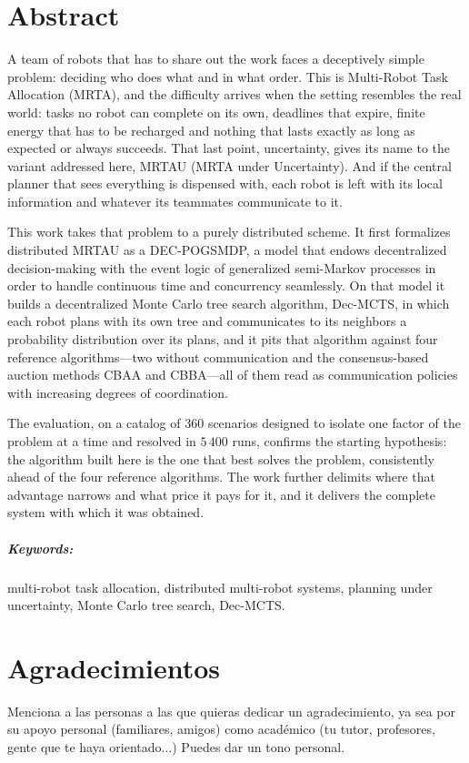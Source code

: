 \documentclass[a4paper,oneside,12pt]{book}
\theoremstyle{definition}
\begin{document}
\chapter{Abstract}
\begin{small}
A team of robots that has to share out the work faces a deceptively simple problem: deciding who does what and in what order. This is Multi-Robot Task Allocation (MRTA), and the difficulty arrives when the setting resembles the real world: tasks no robot can complete on its own, deadlines that expire, finite energy that has to be recharged and nothing that lasts exactly as long as expected or always succeeds. That last point, uncertainty, gives its name to the variant addressed here, MRTAU (MRTA under Uncertainty). And if the central planner that sees everything is dispensed with, each robot is left with its local information and whatever its teammates communicate to it.

This work takes that problem to a purely distributed scheme. It first formalizes distributed MRTAU as a DEC-POGSMDP, a model that endows decentralized decision-making with the event logic of generalized semi-Markov processes in order to handle continuous time and concurrency seamlessly. On that model it builds a decentralized Monte Carlo tree search algorithm, Dec-MCTS, in which each robot plans with its own tree and communicates to its neighbors a probability distribution over its plans, and it pits that algorithm against four reference algorithms---two without communication and the consensus-based auction methods CBAA and CBBA---all of them read as communication policies with increasing degrees of coordination.

The evaluation, on a catalog of $360$ scenarios designed to isolate one factor of the problem at a time and resolved in $5\,400$ runs, confirms the starting hypothesis: the algorithm built here is the one that best solves the problem, consistently ahead of the four reference algorithms. The work further delimits where that advantage narrows and what price it pays for it, and it delivers the complete system with which it was obtained.

\paragraph{Keywords:} multi-robot task allocation, distributed multi-robot systems, planning under uncertainty, Monte Carlo tree search, Dec-MCTS.
\end{small}

\chapter{Agradecimientos}
Menciona a las personas a las que quieras dedicar un agradecimiento,
ya sea por su apoyo personal (familiares, amigos) como académico 
(tu tutor, profesores, gente que te haya orientado...) Puedes dar un
tono personal.
\end{document}
